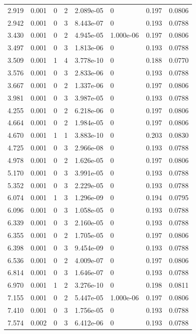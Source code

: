 \documentclass[preview]{standalone}
\begin{document}
{{\begin{tabular}{L{1.2cm}C{1.2cm} C{0.3cm}C{0.5cm} C{1.4cm}C{1.4cm} C{1.4cm}C{1.4cm}}
  2.919  &  0.001  & 0     &  2 &  2.089e-05  & 0  & 0.197 &  0.0806   \\ 
  2.942  &  0.001  & 0     &  3 &  8.443e-07  & 0  & 0.193 &  0.0788   \\ 
  3.430  &  0.001  & 0     &  2 &  4.945e-05  & 1.000e-06  & 0.197 &  0.0806   \\ 
  3.497  &  0.001  & 0     &  3 &  1.813e-06  & 0  & 0.193 &  0.0788   \\ 
  3.509  &  0.001  & 1     &  4 &  3.778e-10  & 0  & 0.188 &  0.0770   \\ 
  3.576  &  0.001  & 0     &  3 &  2.833e-06  & 0  & 0.193 &  0.0788   \\ 
  3.667  &  0.001  & 0     &  2 &  1.337e-06  & 0  & 0.197 &  0.0806   \\ 
  3.981  &  0.001  & 0     &  3 &  3.987e-05  & 0  & 0.193 &  0.0788   \\ 
  4.255  &  0.001  & 0     &  2 &  6.218e-06  & 0  & 0.197 &  0.0806   \\ 
  4.664  &  0.001  & 0     &  2 &  1.984e-05  & 0  & 0.197 &  0.0806   \\ 
  4.670  &  0.001  & 1     &  1 &  3.883e-10  & 0  & 0.203 &  0.0830   \\ 
  4.725  &  0.001  & 0     &  3 &  2.966e-08  & 0  & 0.193 &  0.0788   \\ 
  4.978  &  0.001  & 0     &  2 &  1.626e-05  & 0  & 0.197 &  0.0806   \\ 
  5.170  &  0.001  & 0     &  3 &  3.991e-05  & 0  & 0.193 &  0.0788   \\ 
  5.352  &  0.001  & 0     &  3 &  2.229e-05  & 0  & 0.193 &  0.0788   \\ 
  6.074  &  0.001  & 1     &  3 &  1.296e-09  & 0  & 0.194 &  0.0795   \\ 
  6.096  &  0.001  & 0     &  3 &  1.058e-05  & 0  & 0.193 &  0.0788   \\ 
  6.339  &  0.001  & 0     &  3 &  2.160e-05  & 0  & 0.193 &  0.0788   \\ 
  6.355  &  0.001  & 0     &  2 &  1.705e-05  & 0  & 0.197 &  0.0806   \\ 
  6.398  &  0.001  & 0     &  3 &  9.454e-09  & 0  & 0.193 &  0.0788   \\ 
  6.536  &  0.001  & 0     &  2 &  4.009e-07  & 0  & 0.197 &  0.0806   \\ 
  6.814  &  0.001  & 0     &  3 &  1.646e-07  & 0  & 0.193 &  0.0788   \\ 
  6.970  &  0.001  & 1     &  2 &  3.276e-10  & 0  & 0.198 &  0.0811   \\ 
  7.155  &  0.001  & 0     &  2 &  5.447e-05  & 1.000e-06  & 0.197 &  0.0806   \\ 
  7.410  &  0.001  & 0     &  3 &  1.756e-05  & 0  & 0.193 &  0.0788   \\ 
  7.574  &  0.002  & 0     &  3 &  6.412e-06  & 0  & 0.193 &  0.0788   \\ 
\hline 
\end{tabular} 

}}
\end{document}
